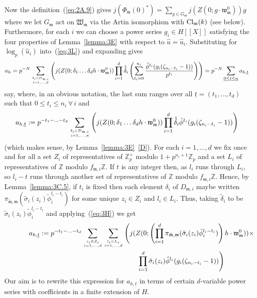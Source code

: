 \documentclass[12pt]{article}
\newcounter{rem}[section]%
\newcommand{\bbZ}{\ensuremath{\mathbb{Z}}}
\newcommand{\beql}[1]{\begin{equation}\label{#1}}
\newcommand{\Cl}{{\rm Cl}}
\newcommand{\eeq}{\end{equation}}
\newcommand{\fm}{\ensuremath{\mathfrak{m}}}
\newcommand{\fw}{\ensuremath{\mathfrak{w}}}
\newcommand{\fW}{\ensuremath{\mathfrak{W}}}
\newcommand{\refeq}[1]{~(\ref{eq:#1})}
\newcommand{\rem}{\refstepcounter{rem}\noindent{\sc Remark \therem}}%
\renewcommand{\therem}{\thesection.\arabic{rem}}
\newcommand{\tfm}{\ensuremath{{\tilde{\fm}}}}
\newcommand{\tphi}{\ensuremath{\tilde{\phi}}}
\newcommand{\tsigma}{\ensuremath{\tilde{\sigma}}}
\begin{document}
Now the definition\refeq{2A.9} gives
$
j(\Phi_\fm(0)^\ast)=\sum_{g\in G_\fm}j(Z(0;g\cdot\fw_\fm^0))g
$
where we let $G_\fm$ act on $\fW_\fm$ via the Artin isomorphism
with $\Cl_\fm(k)$ (see below). Furthermore, for each $i$ we can choose
a power series
$g_i\in H[[X]]$ satisfying the four properties of Lemma~\ref{lemma:3E}
with respect to $\hat{u}=\hat{u}_i$. Substituting for $\log_p(\hat{u}_i)$
into\refeq{3L} and expanding gives
\beql{eq:3M}
a_h=p^{-N}\sum_{\delta_i\in D_{\fm,i}\atop i=1,\ldots,d}
\left(
j(Z(0;\delta_1\ldots\delta_dh\cdot\fw_\fm^0))
\prod_{i=1}^d\check{\tilde{\delta}}_i
\left(\sum_{t_i=0}^{n_i}
\frac{\hat{\phi}^{t_i}(g_i(\zeta_{n_i-t_i}-1))}{p^{t_i}}\right)
\right)=
p^{-N}\sum_{\underline{0}\leq \underline{t}\leq \underline{n}}a_{h,\underline{t}}
\eeq
say, where, in an obvious notation, the last sum ranges over all
$\underline{t}=(t_1,\ldots,t_d)$ such that $0\leq t_i\leq n_i\ \forall\,i$ and
\[
a_{h,\underline{t}}:=p^{-t_1-\ldots-t_d}
\sum_{\delta_i\in D_{\fm,i}\atop i=1,\ldots,d}
\left(
j(Z(0;\delta_1\ldots\delta_dh\cdot\fw_\fm^0))
\prod_{i=1}^d\check{\tilde{\delta}}_i\hat{\phi}^{t_i}(g_i(\zeta_{n_i-t_i}-1))
\right)
\]
(which makes sense, by Lemma~\ref{lemma:3E}~\ref{D}). For
each $i=1,\ldots,d$ we fix once and for all a set
$Z_i$ of representatives of $\bbZ_p^\times$ modulo
$1+p^{n_i+1}\bbZ_p$ and a set
$L_i$ of representatives of $\bbZ$ modulo
$f_{\fm,i}\bbZ$.
If $t$ is any integer then, as $l_i$ runs through $L_i$, so
$l_i-t$ runs through another set of representatives of $\bbZ$ modulo
$f_{\fm,i}\bbZ$. Hence, by Lemma~\ref{lemma:3C.5}, if $t_i$ is fixed then each
element $\delta_i$ of $D_{\fm,i}$ maybe written $\pi_{\tfm,\fm}(\tilde{\sigma}_i(z_i)
\tilde{\phi}_i^{l_i-t_i})$ for some unique $z_i\in Z_i$ and $l_i\in L_i$.
Thus, taking $\tilde{\delta}_i$ to be $\tilde{\sigma}_i(z_i)
\tilde{\phi}_i^{l_i-t_i}$ and applying\refeq{3H} we get
\begin{eqnarray}
\lefteqn{
a_{h,\underline{t}}:=p^{-t_1-\ldots-t_d}
\sum_{z_i\in Z_i\atop i=1,\ldots,d}
\sum_{l_i\in L_i\atop i=1,\ldots,d}
\left(
j(Z(0;\left(\prod_{i=1}^d\pi_{\tfm,\fm}(\tsigma_i(z_i)\tphi_i^{l_i-t_i})\right)
h\cdot\fw_\fm^0))\times\right.}
\hspace*{15em}&&\nonumber\\
 &&\left.\prod_{i=1}^d
\hat{\sigma}_i(z_i)\hat{\phi}^{l_i}
(g_i(\zeta_{n_i-t_i}-1))
\right)
\label{eq:3M.3}
\end{eqnarray}
Our aim is to rewrite this expression
for $a_{h,\underline{t}}$ in terms of certain $d$-variable
power series with coefficients in a finite extension of $H$.
\end{document}
